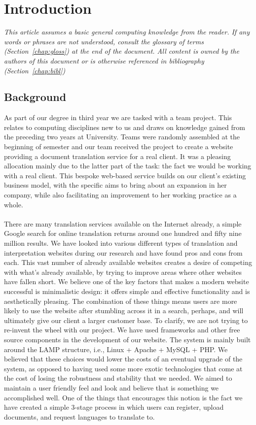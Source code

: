 \documentclass{l3proj}
\begin{document}
\chapter{Introduction}
\label{chap:intro}
\textit{\small{This article assumes a basic general computing knowledge from the
reader. If any words or phrases are not understood, consult the glossary of
terms (Section~\ref{chap:gloss}) at the end of the document. All content is
owned by the authors of this document or is otherwise referenced in bibliography
(Section~\ref{chap:bibl})}}\\
\section{Background}
As part of our degree in third year we are tasked with a team project. This
relates to computing disciplines new to us and draws on knowledge gained from
the preceding two years at University. Teams were randomly assembled at the
beginning of semester and our team received the project to create a website
providing a document translation service for a real client. It was a pleasing
allocation mainly due to the latter part of the task: the fact we would be
working with a real client. This bespoke web-based service builds on our
client's existing business model, with the specific aims to bring about an
expansion in her company, while also facilitating an improvement to her working
practice as a whole.\\
\\
There are many translation services available on the Internet already, a simple
Google search for online translation returns around one hundred and fifty nine
million results. We have looked into various different types of translation and
interpretation websites during our research and have found pros and cons from
each. This vast number of already available websites creates a desire of
competing with what's already available, by trying to improve areas where other
websites have fallen short. We believe one of the key factors that makes a
modern website successful is minimalistic design: it offers simple and effective
functionality and is aesthetically pleasing. The combination of these things
means users are more likely to use the website after stumbling across it in a
search, perhaps, and will ultimately give our client a larger customer base. To
clarify, we are not trying to re-invent the wheel with our project. We have used
frameworks and other free source components in the development of our website.
The system is mainly built around the LAMP structure, i.e., Linux + Apache +
MySQL + PHP. We believed that these choices would lower the costs of an eventual
upgrade of the system, as opposed to having used some more exotic technologies
that come at the cost of losing the robustness and stability that we needed. We
aimed to maintain a user friendly feel and look and believe that is something we
accomplished well. One of the things that encourages this notion is the fact we
have created a simple 3-stage process in which users can register, upload
documents, and request languages to translate to.\\ 
\end{document}
